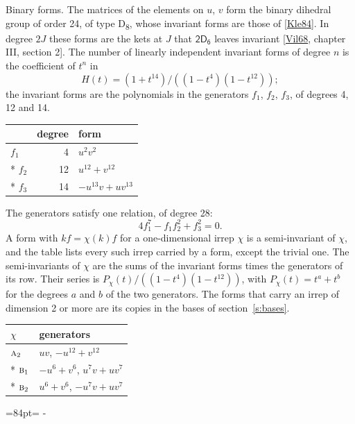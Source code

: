 \documentclass[10pt,a4paper]{article}
\makeatletter
\renewcommand\paragraph{\@startsection{paragraph}{4}{\z@}{1.5ex plus .5ex minus .2ex}{-1em}%
  {\normalfont\small\sffamily\bfseries\color{parttitle}}}
\newcommand{\needspace}[1]{\par\penalty-100\begingroup\dimen0=#1\relax\dimen2=\pagegoal
  \advance\dimen2-\pagetotal\ifdim\dimen0>\dimen2\relax\ifdim\dimen2>0pt\vfil\break\fi\fi
  \endgroup}
\numberwithin{equation}{section}
\newcommand{\grp}[1]{\mathsf{#1}}
\newcommand{\irr}[1]{\text{\normalfont\scshape #1}}
\makeatother
\begin{document}
\paragraph{Binary forms.}
The matrices of the elements on $u$, $v$ form the binary dihedral group of order 24, of type D\textsubscript{8}, whose invariant forms are those of [\href{../../../REFERENCES.pdf\#ref.Kle84}{Kle84}]. In degree $2J$ these forms are the kets at $J$ that $\grp{2D_{6}}$ leaves invariant [\href{../../../REFERENCES.pdf\#ref.Vil68}{Vil68}, chapter III, section 2]. \label{n:head.degree}\label{n:head.form}The number of linearly independent invariant forms of degree $n$ is the coefficient of $t^n$ in
\begin{equation}\label{e:molien}H(t) = (1 + t^{14})/((1-t^{4})(1-t^{12}));\end{equation}
the invariant forms are the polynomials in the generators $f_1$, $f_2$, $f_3$, of degrees 4, 12 and 14.
{\small\begin{longtable}{@{}lrl@{}}\toprule
& degree & form\\\midrule\endhead
\bottomrule\endfoot\endlastfoot
$f_{1}$ & 4 & $u^{2}v^{2}$\\*
$f_{2}$ & 12 & $u^{12} + v^{12}$\\*
$f_{3}$ & 14 & $-u^{13}v + uv^{13}$\\
\bottomrule\end{longtable}}
The generators satisfy one relation, of degree 28:
\begin{equation}\label{e:relation}4f_{1}^{7} - f_{1}f_{2}^{2} + f_{3}^{2} = 0.\end{equation}
A form with $k f = \chi(k) f$ for a one-dimensional irrep $\chi$ is a semi-invariant of $\chi$, and the table lists every such irrep carried by a form, except the trivial one. \label{n:head.generators}The semi-invariants of $\chi$ are the sums of the invariant forms times the generators of its row. Their series is $P_\chi(t)/((1-t^{4})(1-t^{12}))$, with $P_\chi(t) = t^{a} + t^{b}$ for the degrees $a$ and $b$ of the two generators. The forms that carry an irrep of dimension 2 or more are its copies in the bases of section~\ref{s:bases}.
{\small\begin{longtable}{@{}ll@{}}\toprule
$\chi$ & generators\\\midrule\endhead
\bottomrule\endfoot\endlastfoot
$\irr{a}_{2}$ & $uv$, $-u^{12} + v^{12}$\\*
$\irr{b}_{1}$ & $-u^{6} + v^{6}$, $u^{7}v + uv^{7}$\\*
$\irr{b}_{2}$ & $u^{6} + v^{6}$, $-u^{7}v + uv^{7}$\\
\bottomrule\end{longtable}}
\needspace{84pt}
\end{document}
